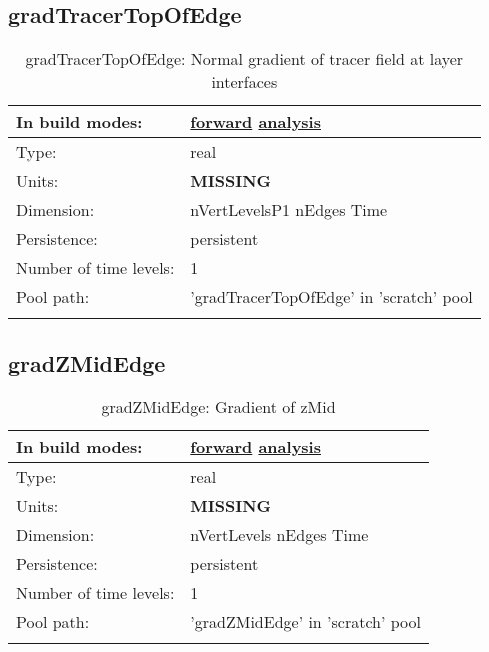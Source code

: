 \subsection[gradTracerTopOfEdge]{gradTracerTopOfEdge}
\label{subsec:var_sec_scratch_gradTracerTopOfEdge}
\begin{center}
\begin{longtable}{| p{2.0in} | p{4.0in} |}
        \hline 
        In build modes: & \hyperref[subsec:forward_var_tab_scratch]{forward} \hyperref[subsec:analysis_var_tab_scratch]{analysis} \\
        \hline 
        Type: & real \\
        \hline 
        Units: & {\bf \color{red} MISSING} \\
        \hline 
        Dimension: & nVertLevelsP1 nEdges Time \\
        \hline 
        Persistence: & persistent \\
        \hline 
        Number of time levels: & 1 \\
        \hline 
            Pool path: & 'gradTracerTopOfEdge' in 'scratch' pool
 \\
		 \hline 
    \caption{gradTracerTopOfEdge: Normal gradient of tracer field at layer interfaces}
\end{longtable}
\end{center}
\subsection[gradZMidEdge]{gradZMidEdge}
\label{subsec:var_sec_scratch_gradZMidEdge}
\begin{center}
\begin{longtable}{| p{2.0in} | p{4.0in} |}
        \hline 
        In build modes: & \hyperref[subsec:forward_var_tab_scratch]{forward} \hyperref[subsec:analysis_var_tab_scratch]{analysis} \\
        \hline 
        Type: & real \\
        \hline 
        Units: & {\bf \color{red} MISSING} \\
        \hline 
        Dimension: & nVertLevels nEdges Time \\
        \hline 
        Persistence: & persistent \\
        \hline 
        Number of time levels: & 1 \\
        \hline 
            Pool path: & 'gradZMidEdge' in 'scratch' pool
 \\
		 \hline 
    \caption{gradZMidEdge: Gradient of zMid}
\end{longtable}
\end{center}
